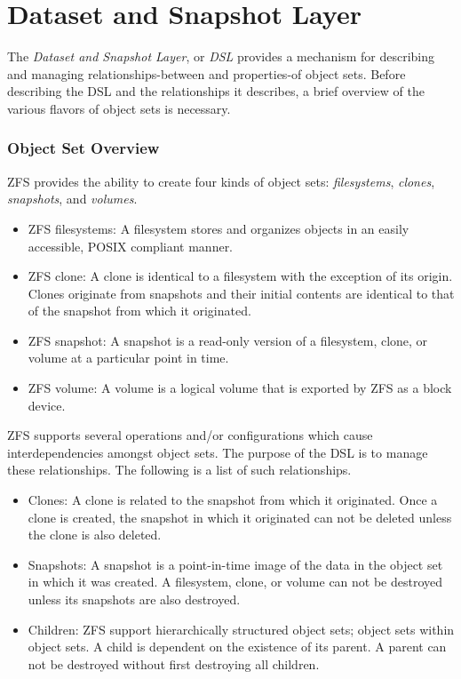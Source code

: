 \chapter{Dataset and Snapshot Layer}\label{chap:dsl}

The \emph{Dataset and Snapshot Layer}, or \emph{DSL}  provides a mechanism
for describing and managing relationships-between and properties-of object sets.
Before describing the DSL and the relationships it describes,
a brief overview of the various flavors of object sets is necessary.

\subsection{Object Set Overview}

ZFS provides the ability to create four kinds of object sets:
\emph{filesystems}, \emph{clones}, \emph{snapshots}, and \emph{volumes}.

\begin{itemize}
  \item{ZFS filesystems:}
  A filesystem stores and organizes objects in an easily accessible, POSIX compliant manner.
  \item{ZFS clone:}
  A clone is identical to a filesystem with the exception of its origin.
  Clones originate from snapshots and their initial contents are identical to
  that of the snapshot from which it originated.
  \item{ZFS snapshot:}
  A snapshot is a read-only version of a filesystem, clone,
  or volume at a particular point in time.
  \item{ZFS volume:}
  A volume is a logical volume that is exported by ZFS as a block device.
\end{itemize}

ZFS supports several operations and/or configurations
which cause interdependencies amongst object sets.
The purpose of the DSL is to manage these relationships.
The following is a list of such relationships.

\begin{itemize}
\item{Clones:}
  A clone is related to the snapshot from which it originated.
  Once a clone is created,
  the snapshot in which it originated can not be deleted unless the clone is also deleted.
\item{Snapshots:}
  A snapshot is a point-in-time image of the data in the object set in which it was created.
  A filesystem, clone, or volume can not be destroyed unless its snapshots are also destroyed.
\item{Children:}
  ZFS support hierarchically structured object sets;
  object sets within object sets.
  A child is dependent on the existence of its parent.
  A parent can not be destroyed without first destroying all children.
\end{itemize}

